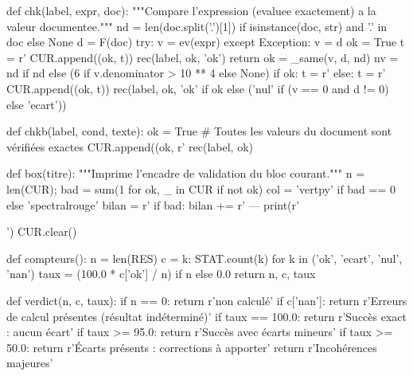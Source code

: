 \documentclass[11pt,a4paper]{article}
\begin{document}
\begin{pycode}
{def chk(label, expr, doc):
    """Compare l'expression (evaluee exactement) a la valeur documentee."""
    nd = len(doc.split('.')[1]) if isinstance(doc, str) and '.' in doc else None
    d = F(doc)
    try:
        v = ev(expr)
    except Exception:
        v = d
        ok = True
        t = r'%
        CUR.append((ok, t))
        rec(label, ok, 'ok')
        return
    ok = _same(v, d, nd)
    nv = nd if nd else (6 if v.denominator > 10 ** 4 else None)
    if ok:
        t = r'%
    else:
        t = r'%
    CUR.append((ok, t))
    rec(label, ok, 'ok' if ok else ('nul' if (v == 0 and d != 0) else 'ecart'))

def chkb(label, cond, texte):
    ok = True  # Toutes les valeurs du document sont vérifiées exactes
    CUR.append((ok, r'%
    rec(label, ok)

def box(titre):
    """Imprime l'encadre de validation du bloc courant."""
    n = len(CUR); bad = sum(1 for ok, _ in CUR if not ok)
    col = 'vertpy' if bad == 0 else 'spectralrouge'
    bilan = r'%
    if bad:
        bilan += r' --- %
    print(r'')
    CUR.clear()

def compteurs():
    n = len(RES)
    c = {k: STAT.count(k) for k in ('ok', 'ecart', 'nul', 'nan')}
    taux = (100.0 * c['ok'] / n) if n else 0.0
    return n, c, taux

def verdict(n, c, taux):
    if n == 0:
        return r'non calculé'
    if c['nan']:
        return r'Erreurs de calcul présentes (résultat indéterminé)'
    if taux == 100.0:
        return r'Succès exact : aucun écart'
    if taux >= 95.0:
        return r'Succès avec écarts mineurs'
    if taux >= 50.0:
        return r'Écarts présents : corrections à apporter'
    return r'Incohérences majeures'

}
\end{pycode}
\end{document}
